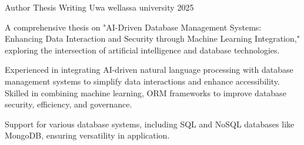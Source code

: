 

\begin{cventries}

  \cventry
    {Author} %
    {Thesis Writing} %
    {Uwa wellassa university} %
    {2025} %
    {
      \begin{cvitems} %
        \item {A comprehensive thesis on "AI-Driven Database Management Systems: Enhancing Data Interaction and Security through Machine Learning Integration," exploring the intersection of artificial intelligence and database technologies.}
        \item {Experienced in integrating AI-driven natural language processing with database management systems to simplify data interactions and enhance accessibility. Skilled in combining machine learning, ORM frameworks to improve database security, efficiency, and governance.}
        \item {Support for various database systems, including SQL and NoSQL databases like MongoDB, ensuring versatility in application.}
      \end{cvitems}
    }

\end{cventries}

